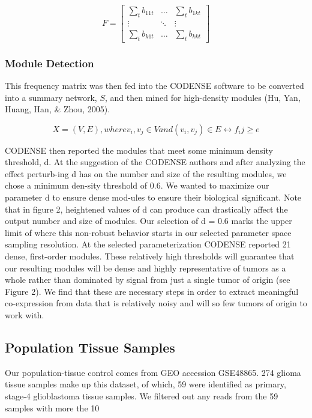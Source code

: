 \documentclass[11pt,twoside,a4paper]{article}
\begin{document}
\begin{equation}\label{equation5}
F = \left[ \begin{array}{ccc}
\sum_{t}b_{11t} & \ldots & \sum_{t}b_{1kt} \\
\vdots & \ddots & \vdots \\
\sum_{t}b_{k1t} & \ldots & \sum_{t}b_{kkt} \end{array} \right]
\end{equation}

\subsubsection{Module Detection}
This frequency matrix was then fed into the CODENSE software to be converted into a summary network, $S$, and then mined for high-density modules (Hu, Yan, Huang, Han, \& Zhou, 2005).  

\begin{equation}\label{equation6}
X=(V,E), where v_i,v_j \in V and (v_i,v_j) \in E \leftrightarrow f_ij \ge e
\end{equation}

CODENSE then reported the modules that meet some minimum density threshold, d. At the suggestion of the CODENSE authors and after analyzing the effect perturb-ing d has on the number and size of the resulting modules, we chose a minimum den-sity threshold of 0.6. We wanted to maximize our parameter d to ensure dense mod-ules to ensure their biological significant. Note that in figure 2, heightened values of d can produce can drastically affect the output number and size of modules. Our selection of d = 0.6 marks the upper limit of where this non-robust behavior starts in our selected parameter space sampling resolution. At the selected parameterization CODENSE reported 21 dense, first-order modules. These relatively high thresholds will guarantee that our resulting modules will be dense and highly representative of tumors as a whole rather than dominated by signal from just a single tumor of origin (see Figure 2).  We find that these are necessary steps in order to extract meaningful co-expression from data that is relatively noisy and will so few tumors of origin to work with.

\subsection{Population Tissue Samples}
Our population-tissue control comes from GEO accession GSE48865. 274 glioma tissue samples make up this dataset, of which, 59 were identified as primary, stage-4 glioblastoma tissue samples. We filtered out any reads from the 59 samples with more the 10%
\end{document}
